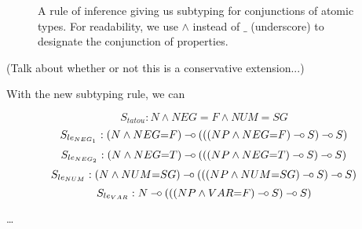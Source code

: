 \begin{figure}
  \begin{prooftree}
  \end{prooftree}
  \caption{\label{fig:type-superset} A rule of inference giving us
    subtyping for conjunctions of atomic types. For readability, we use
    $\land$ instead of $\_$ (underscore) to designate the conjunction of
    properties.}
\end{figure}

(Talk about whether or not this is a conservative extension...)

With the new subtyping rule, we can

$$
S_{tatou} : N \land NEG{=}F \land NUM{=}SG
$$
$$
S_{le_{NEG_1}} : (N \land NEG{=}F) \limp (((NP \land NEG{=}F) \limp S) \limp S)
$$
$$
S_{le_{NEG_2}} : (N \land NEG{=}T) \limp (((NP \land NEG{=}T) \limp S) \limp S)
$$
$$
S_{le_{NUM}} : (N \land NUM{=}SG) \limp (((NP \land NUM{=}SG) \limp S) \limp S)
$$
$$
S_{le_{VAR}} : N \limp (((NP \land VAR{=}F) \limp S) \limp S)
$$

\ldots
